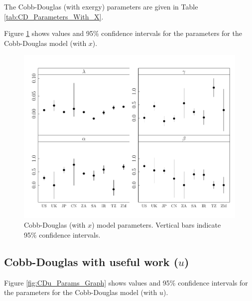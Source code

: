 \documentclass[preprint,authoryear,12pt]{elsarticle}\usepackage{graphicx, color}
\makeatletter
\def\maxwidth{ %
  \ifdim\Gin@nat@width>\linewidth
    \linewidth
  \else
    \Gin@nat@width
  \fi
}
\newenvironment{knitrout}{}{} %
\makeatother
\begin{document}
The Cobb-Douglas (with exergy) parameters are given in Table \ref{tab:CD_Parameters_With_X}.

Figure \ref{fig:CDx_Params_Graph} shows values and 95\% confidence intervals for the parameters for the Cobb-Douglas model (with $x$).

\begin{knitrout}
\color{fgcolor}\begin{figure}[H]

\includegraphics[width=\maxwidth]{figure/CDx_Params_Graph} \caption[Cobb-Douglas (with $x$) model parameters]{Cobb-Douglas (with $x$) model parameters. Vertical bars indicate 95\% confidence intervals.\label{fig:CDx_Params_Graph}}
\end{figure}


\end{knitrout}


\subsection{Cobb-Douglas with useful work ($u$)}

Figure \ref{fig:CDu_Params_Graph} shows values and 95\% confidence intervals for the parameters for the Cobb-Douglas model (with $u$).
\end{document}
